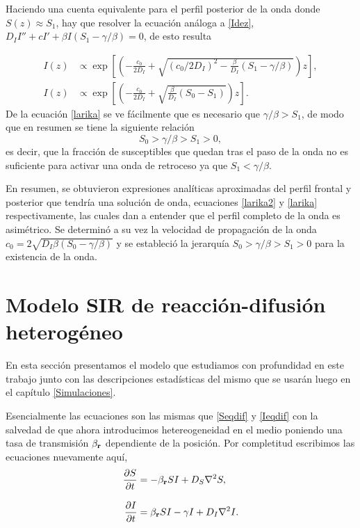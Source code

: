 Haciendo una cuenta equivalente para el perfil posterior de la onda donde $S(z)\approx S_1$, hay que resolver la ecuación análoga a \ref{Idez}, 
$D_I I'' + cI'+\beta I(S_1-\gamma/\beta)=0$, de esto resulta 

\begin{align}
  I(z)&\propto \exp[\left(-\frac{c_0}{2D_I}+\sqrt{(c_0/2D_I)^2-\frac{\beta}{D_I}(S_1-\gamma/\beta)}\right)z], \label{larika} \\[.3cm]
  I(z)&\propto \exp[\left(-\frac{c_0}{2D_I}+ \sqrt{\frac{\beta}{D_I}(S_0-S_1)}\right)z].
\end{align}
De la ecuación \ref{larika} se ve fácilmente que es necesario que $\gamma/\beta>S_1$, de modo que en resumen se tiene la siguiente relación
\[S_0>\gamma/\beta>S_1>0,\]
es decir, que la fracción de susceptibles que quedan tras el paso de la onda no es suficiente para activar una onda de retroceso ya que $S_1<\gamma/\beta$.

En resumen, se obtuvieron expresiones analíticas aproximadas del perfil frontal y posterior que tendría una solución de onda, ecuaciones \ref{larika2} 
y \ref{larika} respectivamente, las cuales dan a entender que el perfil completo de la onda es asimétrico. Se determinó a su vez la velocidad de propagación de la onda $c_0=2\sqrt{D_I\beta(S_0-\gamma/\beta)}$ y se estableció la 
jerarquía $S_0>\gamma/\beta>S_1>0$ para la existencia de la onda.


\section{Modelo SIR de reacción-difusión heterogéneo}
\label{S:Modelo SIR espacial het}

En esta sección presentamos el modelo que estudiamos con profundidad en este trabajo junto con las descripciones estadísticas del mismo que se usarán 
luego en el capítulo \ref{Simulaciones}. 

Esencialmente las ecuaciones son las mismas que \ref{Seqdif} y \ref{Ieqdif} con la salvedad de que ahora introducimos hetereogeneidad en el medio poniendo 
una tasa de transmisión $\beta_{\vb{r}}$ dependiente de la posición. Por completitud escribimos las ecuaciones nuevamente aquí,
\begin{align}
  \pdv{S}{t}&=-\beta_{\vb{r}} SI + D_{S} \laplacian{S}  ,\label{Seqfinal}\\[.3cm]
  \pdv{I}{t}&=\beta_{\vb{r}} SI - \gamma I + D_{I} \laplacian{I}.\label{Ieqfinal}
\end{align}

